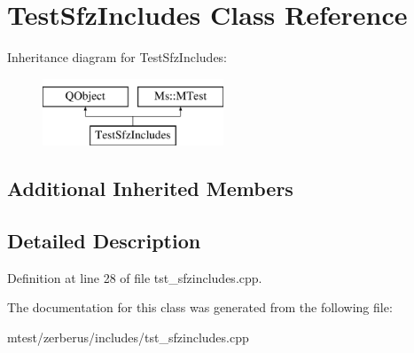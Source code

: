 \hypertarget{class_test_sfz_includes}{}\section{Test\+Sfz\+Includes Class Reference}
\label{class_test_sfz_includes}
Inheritance diagram for Test\+Sfz\+Includes\+:\begin{figure}[H]
\begin{center}
\leavevmode
\includegraphics[height=2.000000cm]{class_test_sfz_includes}
\end{center}
\end{figure}
\subsection*{Additional Inherited Members}


\subsection{Detailed Description}


Definition at line 28 of file tst\+\_\+sfzincludes.\+cpp.



The documentation for this class was generated from the following file\+:\begin{DoxyCompactItemize}
\item 
mtest/zerberus/includes/tst\+\_\+sfzincludes.\+cpp\end{DoxyCompactItemize}
